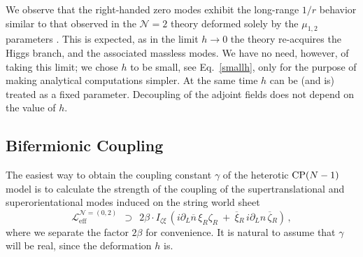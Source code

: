 \documentclass[12pt]{article}
\def\beq{\begin{equation}}
\def\eeq{\end{equation}}
\newcommand{\ntwo}{${\mathcal N}=2$ }
\newcommand{\p}{\partial}
\newcommand{\ov}{\overline}
\newcommand{\mc}[1]{\mathcal{#1}}
\newcommand{\bxir}{\ov{\xi}{}_R}
\newcommand{\xir}{\xi_R}
\newcommand{\bzr}{\ov{\zeta}{}_R}
\newcommand{\zr}{\zeta_R}
\newcommand{\nbar}{\ov{n}}
\begin{document}
We observe that the right-handed zero modes exhibit the long-range $1/r$ behavior similar to that observed
in the \ntwo theory deformed solely by the $\mu_{1,2}$ parameters \cite{GSYmmodel,SYhet}. 
This is expected, as in the limit $ h \to 0 $ the theory re-acquires the Higgs branch, and the associated
massless modes. 
We have no need, however, of taking this limit; we chose $ h $ to be small, 
see Eq.~\eqref{smallh}, only for the purpose of making analytical computations simpler. At the same time
$h$ can be (and is) treated as a fixed parameter. Decoupling of the adjoint fields does not depend
on the value of $h$.

\subsection{Bifermionic Coupling}

The easiest way to obtain the coupling constant $ \gamma $ of the heterotic ${\rm CP}(N-1)$ model
is to calculate the strength of the coupling of the supertranslational and superorientational
modes induced on the string world sheet
\beq
\label{bif_norm}
	\mc{L}_\text{eff}^{\mc{N}=(0,2)} ~~\supset~~
	2\beta \cdot I_{\zeta\xi}\, ( i\p_L\nbar\,\xir\zr ~+~ \bxir\,i\p_L n\, \bzr )\,,
\eeq
where we separate the factor  $ 2\beta $ for convenience. 
It is natural to assume that $ \gamma $ will be real, since the deformation $h$ is.
\end{document}
